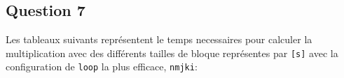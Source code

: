 \documentclass{article}
\begin{document}
\newpage\subsection*{Question 7}
\begin{resolution}
    Les tableaux suivants représentent le temps necessaires pour calculer la multiplication avec des différents tailles de bloque représentes par \texttt{[s]} avec la configuration de \texttt{loop} la plus efficace, \texttt{nmjki}:
    \begin{center}
        \begin{minipage}[b]{0.3\textwidth}
        \end{minipage}
        \begin{minipage}[b]{0.3\textwidth}
        \end{minipage}
        \begin{minipage}[b]{0.3\textwidth}
        \end{minipage}
    \end{center}


\end{resolution}
\end{document}
